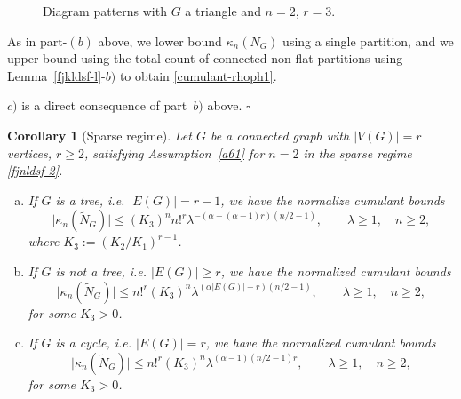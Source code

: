 \documentclass[12pt]{article}
\newtheorem{corollary}[prop]{Corollary}
\newenvironment{Proof}{\removelastskip\par\medskip
\noindent{\em Proof.} \rm}{\penalty-20\null\hfill$\square$\par\medbreak}
\numberwithin{equation}{section}
\begin{document}
\begin{Proof}
\begin{figure}[H]
{\begin{tikzpicture}[scale=0.9]
\end{tikzpicture}}
\caption{Diagram patterns with $G$ a triangle and $n=2$, $r=3$.}
\label{fig:diagram3-23}
\end{figure}

\vskip-0.3cm

\noindent
 As in part-$(b)$ above, we lower
 bound $\kappa_n(N_G)$ using a single partition,
 and we upper bound using the total count of
 connected non-flat partitions using Lemma~\ref{fjkldsf-l}-$b)$
 to obtain \eqref{cumulant-rhoph1}.
 
\noindent
   $c)$ is a direct consequence of part~$b)$ above.
\end{Proof}

\begin{corollary}[Sparse regime] 
\label{th6.4-c}
  Let $G$ be a connected graph with $|V(G)|=r$ vertices, $r\geq 2$,
  satisfying Assumption~\ref{a61} for $n=2$ in the sparse regime \eqref{fjnldsf-2}. 
  \begin{enumerate}[a)] 
  \item 
    If $G$ is a tree, i.e. $|E(G)| = r-1$, we have the normalize
    cumulant bounds %
 \begin{equation}
   \label{jfkla} 
   \big|\kappa_n(\widetilde{N}_G)\big|
  \leq 
   (K_3)^n 
 n!^r
      \lambda^{
       - (
\alpha       -(\alpha - 1)r 
       ) ( n/2-1 ) },
   \qquad \lambda \geq 1,
   \quad n \geq 2, 
\end{equation} 
 where $K_3:=(K_2/K_1)^{r-1}$.
\item
 If $G$ is not a tree, i.e. $|E(G)|\geq r$,
 we have the normalized cumulant bounds %
 \begin{equation}
   \label{fjklds34} 
    \big|\kappa_n(\widetilde{N}_G)\big|
  \leq 
    n!^r
    (K_3)^n
        \lambda^{(\alpha |E(G)|-r)(n/2-1)}  , 
   \qquad \lambda \geq 1,
  \quad n \geq 2, 
\end{equation} 
 for some $K_3 > 0$. 
\item
  If $G$ is a cycle, i.e. $|E(G)| = r$,
  we have the normalized cumulant bounds %
 \begin{equation}
   \label{fjklds34-2} 
    \big|\kappa_n(\widetilde{N}_G)\big|
  \leq 
  n!^r
  (K_3)^n
    \lambda^{ (\alpha -1 )(n/2-1)r}, 
     \qquad \lambda \geq 1,
 \quad n \geq 2, 
\end{equation} 
 for some $K_3>0$.
  \end{enumerate}
\end{corollary}
\end{document}
